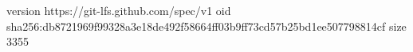 version https://git-lfs.github.com/spec/v1
oid sha256:db8721969f99328a3e18de492f58664ff03b9ff73cd57b25bd1ee507798814cf
size 3355
